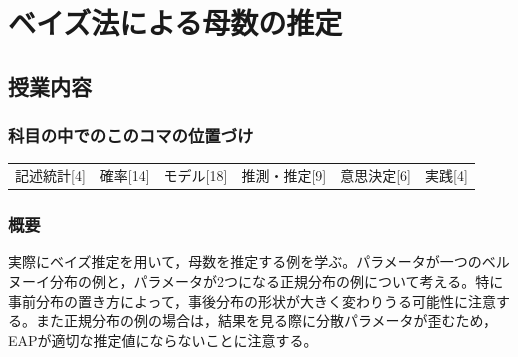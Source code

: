 \section{ベイズ法による母数の推定}
\label{lesson27}

\subsection{授業内容}
\subsubsection{科目の中でのこのコマの位置づけ}
\begin{tabular}[t]{cccccc}
    記述統計[4] & 確率[14] & モデル[18] & 推測・推定[9] & 意思決定[6] & 実践[4]
\end{tabular}

\subsubsection{概要}
実際にベイズ推定を用いて，母数を推定する例を学ぶ。パラメータが一つのベルヌーイ分布の例と，パラメータが2つになる正規分布の例について考える。特に事前分布の置き方によって，事後分布の形状が大きく変わりうる可能性に注意する。また正規分布の例の場合は，結果を見る際に分散パラメータが歪むため，EAPが適切な推定値にならないことに注意する。

